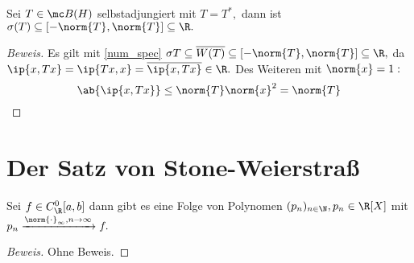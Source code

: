 \begin{theorem} Sei $T \in \mc B(H)$ selbstadjungiert mit $T = T^*,$ dann ist $\sigma(T) \subseteq [- \norm{T}, \norm{T}] \subseteq \R.$
	
	
	\begin{proof}[Beweis] Es gilt mit \ref{num_spec} $\sigma{T} \subseteq \overline{W(T)} \subseteq [-\norm{T}, \norm{T}] \subseteq \R,$ da $\ip{x, Tx} = \ip{Tx, x} = \overline{\ip{x, Tx}} \in \R.$ Des Weiteren mit $\norm{x} = 1:$ \[\ab{\ip{x, Tx}} \leq \norm{T}\norm{x}^2 = \norm{T}\]
		
	\end{proof}
	
\end{theorem}


\section{Der Satz von Stone-Weierstraß}

\begin{theorem} Sei $f \in C^0_{\R}[a, b]$ dann gibt es eine Folge von Polynomen $(p_n)_{n \in \N}, p_n \in \R[X]$ mit $p_n \xrightarrow{\norm{\cdot}_{\infty}, n \to \infty}f.$
	
	\begin{proof}[Beweis] Ohne Beweis.
		
	\end{proof}
	
\end{theorem}


